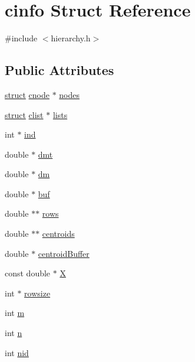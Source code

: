 \hypertarget{structcinfo}{}\section{cinfo Struct Reference}
\label{structcinfo}


{\ttfamily \#include $<$hierarchy.\+h$>$}

\subsection*{Public Attributes}
\begin{DoxyCompactItemize}
\item 
\hyperlink{gen__mat5files_8m_aa5a86657308844fba3fe81ef5286ca5f}{struct} \hyperlink{structcnode}{cnode} $\ast$ \hyperlink{structcinfo_a3d463b6737303bf11f9927618ae73695}{nodes}
\item 
\hyperlink{gen__mat5files_8m_aa5a86657308844fba3fe81ef5286ca5f}{struct} \hyperlink{structclist}{clist} $\ast$ \hyperlink{structcinfo_a80ef4ce82ee975b3d02b48a481e87eb1}{lists}
\item 
int $\ast$ \hyperlink{structcinfo_a0c1c29f2a39eb8b77ea7fdcdb3e5b83a}{ind}
\item 
double $\ast$ \hyperlink{structcinfo_a4f7748234674127c29e3d2650879059b}{dmt}
\item 
double $\ast$ \hyperlink{structcinfo_a32855d69d5411fa23aa91e015a9390f1}{dm}
\item 
double $\ast$ \hyperlink{structcinfo_aec607b45c0e5c27a565f47e87676fca9}{buf}
\item 
double $\ast$$\ast$ \hyperlink{structcinfo_ad5fc6e711314637ca47854810bffe1a6}{rows}
\item 
double $\ast$$\ast$ \hyperlink{structcinfo_ab40b9818006690872cd60b3f9d3c11cb}{centroids}
\item 
double $\ast$ \hyperlink{structcinfo_a509c4a984293e840e4e66d7671a85025}{centroid\+Buffer}
\item 
const double $\ast$ \hyperlink{structcinfo_a6ff14a480d96f620f456ed9b3338e4b2}{X}
\item 
int $\ast$ \hyperlink{structcinfo_af19b6bf2f34a7366b57568ea0453d7f0}{rowsize}
\item 
int \hyperlink{structcinfo_a41beac5c1f5c511ce7e8fdeedd0432ae}{m}
\item 
int \hyperlink{structcinfo_acfaad92e48eecc9a713f97ae690a3c64}{n}
\item 
int \hyperlink{structcinfo_a9474ec146eae839e2408f722aa51561c}{nid}
\end{DoxyCompactItemize}


